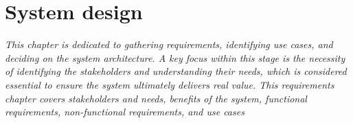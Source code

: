 \chapter{System design}
\indent\textit{This chapter is dedicated to gathering requirements, identifying use cases, and deciding on the system architecture. A key focus within this stage is the necessity of identifying the stakeholders and understanding their needs, which is considered essential to ensure the system ultimately delivers real value. This requirements chapter covers stakeholders and needs, benefits of the system, functional requirements, non-functional requirements, and use cases}












